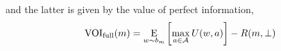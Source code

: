 %
and the latter is given by the value of perfect information,
%
\begin{equation}
  \label{eq:vpi}
  \VPI(m) = \expectunder{\max_{a \in \A} U(w, a)}{w \sim b_m} - R(m, \bot)
\end{equation}

%








